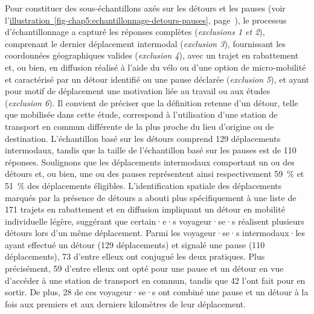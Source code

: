 \begin{refsegment}
Pour constituer des sous-échantillons axés sur les détours et les pauses (voir l'\hyperref[fig-chap5:echantillonnage-detours-pauses]{illustration~\ref{fig-chap5:echantillonnage-detours-pauses}}, page~\pageref{fig-chap5:echantillonnage-detours-pauses}), le processus d'échantillonnage a capturé les réponses complètes (\textsl{exclusions 1 et 2}), comprenant le dernier déplacement intermodal (\textsl{exclusion 3}), fournissant les coordonnées géographiques valides (\textsl{exclusion 4}), avec un trajet en rabattement et, ou bien, en diffusion réalisé à l'aide du vélo ou d'une option de micro-mobilité et caractérisé par un détour identifié ou une pause déclarée (\textsl{exclusion 5}), et ayant pour motif de déplacement une motivation liée au travail ou aux études (\textsl{exclusion 6}). Il convient de préciser que la définition retenue d'un détour, telle que mobilisée dans cette étude, correspond à l'utilisation d'une station de transport en commun différente de la plus proche du lieu d'origine ou de destination. L'échantillon basé sur les détours comprend 129 déplacements intermodaux, tandis que la taille de l'échantillon basé sur les pauses est de 110 réponses. Soulignons que les déplacements intermodaux comportant un ou des détours et, ou bien, une ou des pauses représentent ainsi respectivement 59~\% et 51~\% des déplacements éligibles. L'identification spatiale des déplacements marqués par la présence de détours a abouti plus spécifiquement à une liste de 171 trajets en rabattement et en diffusion impliquant un détour en mobilité individuelle légère, suggérant que certain·e·s voyageur·se·s réalisent plusieurs détours lors d'un même déplacement. Parmi les voyageur·se·s intermodaux·les ayant effectué un détour (129 déplacements) et signalé une pause (110 déplacements), 73 d'entre elleux ont conjugué les deux pratiques. Plus précisément, 59 d'entre elleux ont opté pour une pause et un détour en vue d'accéder à une station de transport en commun, tandis que 42 l'ont fait pour en sortir. De plus, 28 de ces voyageur·se·s ont combiné une pause et un détour à la fois aux premiers et aux derniers kilomètres de leur déplacement.%


\end{refsegment}
